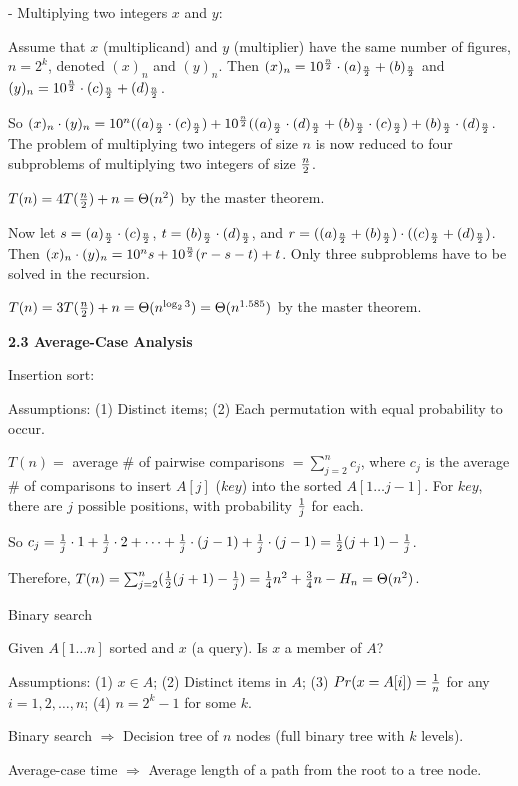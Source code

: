 - Multiplying two integers $x$ and $y$: 

Assume that $x$ (multiplicand) and $y$ (multiplier) 
have the same number of figures, $n=2^k$,
denoted $(x)_n$ and $(y)_n$.
Then $(x)_n=10^{n\over2}\cdot(a)_{n\over2}+(b)_{n\over2}$ and
$(y)_n=10^{n\over2}\cdot(c)_{n\over2}+(d)_{n\over2}$.

So $(x)_n\cdot(y)_n=10^n((a)_{n\over2}\cdot (c)_{n\over2})+
10^{n\over2}((a)_{n\over2}\cdot (d)_{n\over2}+ (b)_{n\over2}\cdot
(c)_{n\over2})+(b)_{n\over2}\cdot (d)_{n\over2}$. The problem of 
multiplying two integers of size $n$ is now reduced to four subproblems
of multiplying two integers of size $n\over2$.

$T(n)=4T({n\over2})+n=\Theta(n^2)$ by the master theorem.

Now let $s=(a)_{n\over2}\cdot (c)_{n\over2}$,
$t=(b)_{n\over2}\cdot (d)_{n\over2}$, and
$r=((a)_{n\over2}+(b)_{n\over2})\cdot((c)_{n\over2}+(d)_{n\over2})$.
Then $(x)_n\cdot(y)_n=10^ns+10^{n\over2}(r-s-t)+t$. Only three
subproblems have to be solved in the recursion.

$T(n)=3T({n\over2})+n=\Theta(n^{\log_23})=\Theta(n^{1.585})$ 
by the master theorem.


    \textbf{2.3 Average-Case Analysis}

Insertion sort:

Assumptions: (1) Distinct items; (2) Each permutation with equal
probability to occur.

$T(n)=$ average \# of pairwise comparisons $=\sum_{j=2}^n c_j$, where
$c_j$ is the average \# of comparisons to insert $A[j]$ ($key$) into the sorted
$A[1\ldots j-1]$. For $key$, there are $j$ possible positions, with 
probability ${1\over j}$ for each.

So $c_j={1\over j}\cdot 1+{1\over j}\cdot 2+\cdots+{1\over j}\cdot (j-1)
+{1\over j}\cdot (j-1)={1\over2}(j+1)-{1\over j}$.

Therefore, $T(n)=\sum_{j=2}^n({1\over2}(j+1)-{1\over j})
={1\over4}n^2+{3\over4}n-H_n=\Theta(n^2)$.


Binary search

Given $A[1\ldots n]$ sorted and $x$ (a query). Is $x$ a member of $A$?


Assumptions: (1) $x\in A$; (2) Distinct items in $A$; (3)
$Pr(x=A[i])={1\over n}$ for any $i=1,2,\ldots,n$; (4) $n=2^k-1$ for some $k$.

Binary search $\Rightarrow$ Decision tree of $n$ nodes (full binary tree
with $k$ levels).

Average-case time $\Rightarrow$ Average length of a path from the root to
a tree node.

